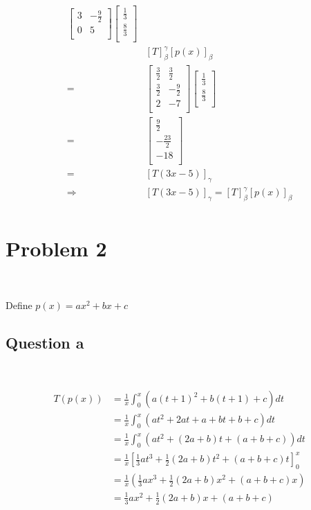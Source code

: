 \documentclass{article}
\begin{document}
\begin{equation*}
\begin{split}
\begin{bmatrix}
3&-\frac{9}{2}\\
0&5\\
\end{bmatrix} \begin{bmatrix}
\frac{1}{3}\\
\frac{8}{3}\\
\end{bmatrix}\\
&\left[T\right]^\gamma_\beta\left[p(x)\right]_\beta\\
=&\begin{bmatrix}
\frac{3}{2}&\frac{3}{2}\\
\frac{3}{2}&-\frac{9}{2}\\
2&-7\\
\end{bmatrix}\begin{bmatrix}
\frac{1}{3}\\
\frac{8}{3}\\
\end{bmatrix}\\
=&\begin{bmatrix}
\frac{9}{2}\\
-\frac{23}{2}\\
-18\\
\end{bmatrix}\\
=&\left[T(3x-5)\right]_\gamma\\
\Rightarrow &\left[T(3x-5)\right]_\gamma=\left[T\right]^\gamma_\beta\left[p(x)\right]_\beta\\
\end{split}
\end{equation*}

\newpage

\section{Problem 2}

~

Define $p(x)=ax^2+bx+c$
\subsection{Question a}

~

\begin{equation*}
\begin{split}
T(p(x))&=\frac{1}{x}\int^x_0(a(t+1)^2+b(t+1)+c)dt\\
&=\frac{1}{x}\int^x_0(at^2+2at+a+bt+b+c)dt\\
&=\frac{1}{x}\int^x_0(at^2+(2a+b)t+(a+b+c))dt\\
&=\frac{1}{x}\left[\frac{1}{3}at^3+\frac{1}{2}(2a+b)t^2+(a+b+c)t\right]^x_0\\
&=\frac{1}{x}(\frac{1}{3}ax^3+\frac{1}{2}(2a+b)x^2+(a+b+c)x)\\
&=\frac{1}{3}ax^2+\frac{1}{2}(2a+b)x+(a+b+c)\\
\end{split}
\end{equation*}
\end{document}
